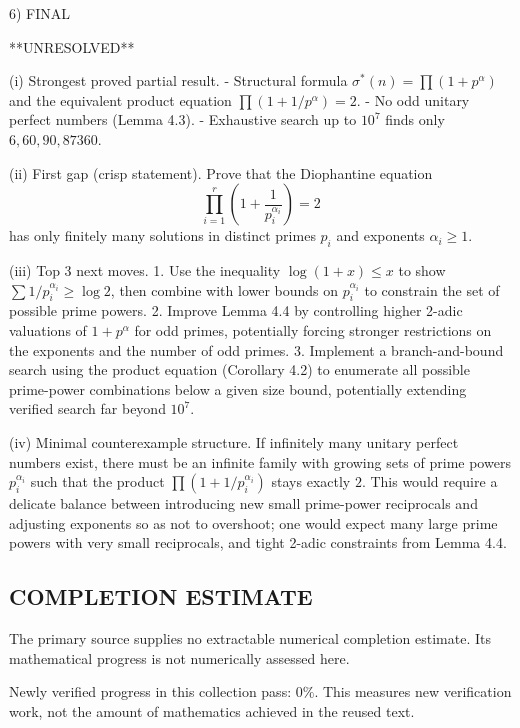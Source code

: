 6) FINAL

**UNRESOLVED**

(i) Strongest proved partial result.
- Structural formula $\sigma^*(n)=\prod (1+p^\alpha)$ and the equivalent product equation
  $\prod (1+1/p^\alpha)=2$.
- No odd unitary perfect numbers (Lemma 4.3).
- Exhaustive search up to $10^7$ finds only $6,60,90,87360$.

(ii) First gap (crisp statement).
Prove that the Diophantine equation
\[
  \prod_{i=1}^r \left(1+\frac{1}{p_i^{\alpha_i}}\right)=2
\]
has only finitely many solutions in distinct primes $p_i$ and exponents $\alpha_i\ge 1$.

(iii) Top 3 next moves.
1. Use the inequality $\log(1+x)\le x$ to show
   $\sum 1/p_i^{\alpha_i} \ge \log 2$, then combine with lower bounds on $p_i^{\alpha_i}$
   to constrain the set of possible prime powers.
2. Improve Lemma 4.4 by controlling higher 2-adic valuations of $1+p^\alpha$ for odd primes,
   potentially forcing stronger restrictions on the exponents and the number of odd primes.
3. Implement a branch-and-bound search using the product equation (Corollary 4.2) to enumerate all
   possible prime-power combinations below a given size bound, potentially extending verified search
   far beyond $10^7$.

(iv) Minimal counterexample structure.
If infinitely many unitary perfect numbers exist, there must be an infinite family with growing sets
of prime powers $p_i^{\alpha_i}$ such that the product $\prod(1+1/p_i^{\alpha_i})$ stays exactly $2$.
This would require a delicate balance between introducing new small prime-power reciprocals and
adjusting exponents so as not to overshoot; one would expect many large prime powers with very small
reciprocals, and tight 2-adic constraints from Lemma 4.4.



\subsection*{COMPLETION ESTIMATE}
The primary source supplies no extractable numerical completion estimate. Its mathematical progress is not numerically assessed here.

Newly verified progress in this collection pass: $0\%$. This measures new verification work, not the amount of mathematics achieved in the reused text.
